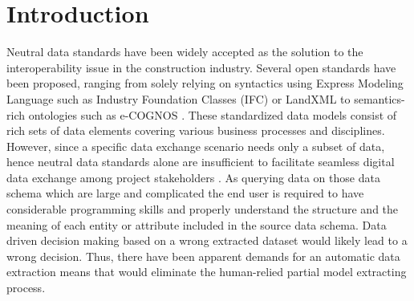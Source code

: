 \documentclass[Journal, InsideFigs, DoubleSpace]{ascelike} %
\begin{document}
\section{Introduction}%
Neutral data standards have been widely accepted as the solution to the interoperability issue in the construction industry. Several open standards have been proposed, ranging from solely relying on syntactics using Express Modeling Language such as Industry Foundation Classes (IFC) \cite{buildingsmartIFC} or LandXML \cite{landxmlorg} to semantics-rich ontologies such as e-COGNOS \cite{Lima05}. These standardized data models consist of rich sets of data elements covering various business processes and disciplines. However, since a specific data exchange scenario needs only a subset of data, hence neutral data standards alone are insufficient to facilitate seamless digital data exchange among project stakeholders \cite{Froese03,east12}. As querying data on those data schema which are large and complicated the end user is required to have considerable programming skills and properly understand the structure and the meaning of each entity or attribute included in the source data schema. Data driven decision making based on a wrong extracted dataset would likely lead to a wrong decision. Thus, there have been apparent demands for an automatic data extraction means that would eliminate the human-relied partial model extracting process. 
\par
\end{document}
